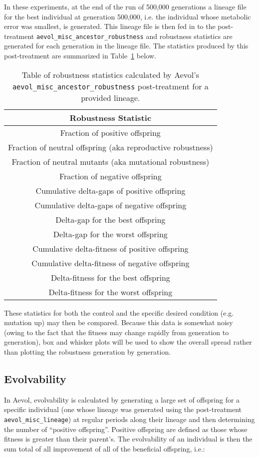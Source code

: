 In these experiments, at the end of the run of 500,000 generations a lineage file for the best individual at generation 500,000, i.e. the individual whose metabolic error was smallest, is generated. This lineage file is then fed in to the post-treatment \texttt{aevol\_misc\_ancestor\_robustness} and robustness statistics are generated for each generation in the lineage file. The statistics produced by this post-treatment are summarized in Table~\ref{table:robustness} below.
\begin{table}[H]
	\centering
	\begin{tabular}{||c||}
		\hline
		\textbf{Robustness Statistic} \\
		\hline \hline
		Fraction of positive offspring \\
		\hline
		Fraction of neutral offspring (aka reproductive robustness) \\
		\hline
		Fraction of neutral mutants (aka mutational robustness) \\
		\hline
		Fraction of negative offspring \\
		\hline
		Cumulative delta-gaps of positive offspring \\
		\hline
		Cumulative delta-gaps of negative offspring \\
		\hline
		Delta-gap for the best offspring \\
		\hline
		Delta-gap for the worst offspring \\
		\hline
		Cumulative delta-fitness of positive offspring \\
		\hline
		Cumulative delta-fitness of negative offspring \\
		\hline
		Delta-fitness for the best offspring \\
		\hline
		Delta-fitness for the worst offspring \\
		\hline
		
	\end{tabular}
	\caption[Aevol robustness statistics]{Table of robustness statistics calculated by Aevol's \texttt{aevol\_misc\_ancestor\_robustness} post-treatment for a provided lineage.}
	\label{table:robustness}
\end{table}
These statistics for both the control and the specific desired condition (e.g. mutation up) may then be compared. Because this data is somewhat noisy (owing to the fact that the fitness may change rapidly from generation to generation), box and whisker plots will be used to show the overall spread rather than plotting the robustness generation by generation. 
\subsection{Evolvability}\label{aevol:evolvability}
In Aevol, evolvability is calculated by generating a large set of offspring for a specific individual (one whose lineage was generated using the post-treatment \texttt{aevol\_misc\_lineage}) at regular periods along their lineage and then determining the number of ``positive offspring''. Positive offspring are defined as those whose fitness is greater than their parent's. The evolvability of an individual is then the sum total of all improvement of all of the beneficial offspring, i.e.:

